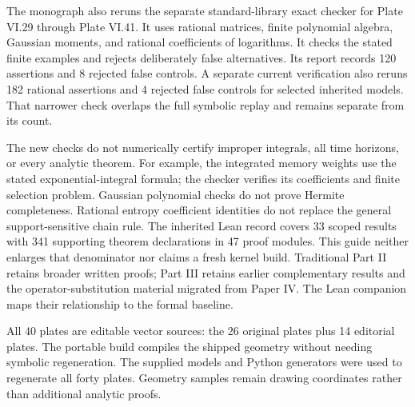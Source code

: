 The monograph also reruns the separate standard-library exact checker for Plate VI.29 through Plate VI.41. It uses rational matrices, finite polynomial algebra, Gaussian moments, and rational coefficients of logarithms. It checks the stated finite examples and rejects deliberately false alternatives. Its report records 120 assertions and 8 rejected false controls. A separate current verification also reruns 182 rational assertions and 4 rejected false controls for selected inherited models. That narrower check overlaps the full symbolic replay and remains separate from its count.

The new checks do not numerically certify improper integrals, all time horizons, or every analytic theorem. For example, the integrated memory weights use the stated exponential-integral formula; the checker verifies its coefficients and finite selection problem. Gaussian polynomial checks do not prove Hermite completeness. Rational entropy coefficient identities do not replace the general support-sensitive chain rule.
The inherited Lean record covers 33 scoped results with 341 supporting theorem declarations in 47 proof modules. This guide neither enlarges that denominator nor claims a fresh kernel build. Traditional Part II retains broader written proofs; Part III retains earlier complementary results and the operator-substitution material migrated from Paper IV. The Lean companion maps their relationship to the formal baseline.

All 40 plates are editable vector sources: the 26 original plates plus 14 editorial plates. The portable build compiles the shipped geometry without needing symbolic regeneration. The supplied models and Python generators were used to regenerate all forty plates. Geometry samples remain drawing coordinates rather than additional analytic proofs.
